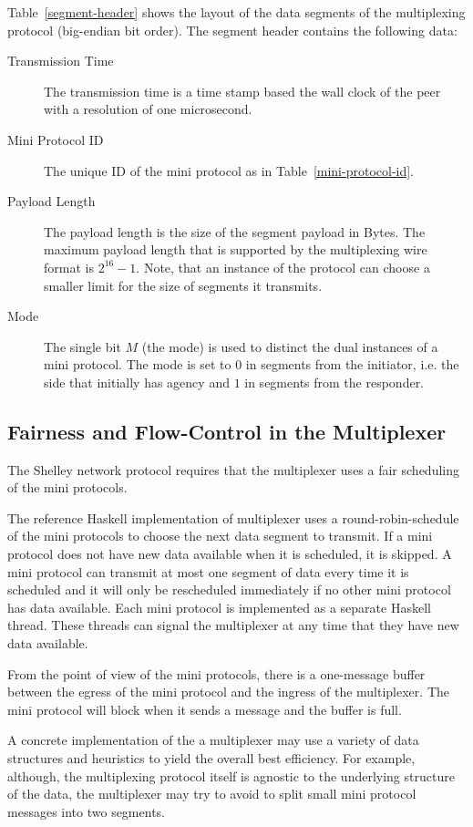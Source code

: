 \documentclass{report}
\theoremstyle{definition}{
  \newtheorem{lemma}{Lemma}[section] %
  \newtheorem{definition}[lemma]{Definition}
}
\theoremstyle{theorem}{
  \newtheorem{invariant}[lemma]{Invariant}
  \newtheorem{proofobligation}[lemma]{Proof Obligation}
}
\numberwithin{equation}{lemma}
\begin{document}
Table~\ref{segment-header} shows the layout of the data segments of the multiplexing protocol
(big-endian bit order).
The segment header contains the following data:
\begin{description}
\item[Transmission Time]
  The transmission time is a time stamp based the wall clock of the peer with a
  resolution of one microsecond.
\item[Mini Protocol ID] The unique ID of the mini protocol as in Table~\ref{mini-protocol-id}.
\item[Payload Length] The payload length is the size of the segment payload in Bytes.
  The maximum payload length that is supported by the multiplexing wire format is $2^{16}-1$.
  Note, that an instance of the protocol can choose a smaller limit for the size of segments it transmits.
\item[Mode] The single bit $M$ (the mode) is used to distinct the dual instances of a mini protocol.
  The mode is set to $0$ in segments from the initiator, i.e. the side that initially has agency and
  $1$ in segments from the responder.
\end{description}

\subsection{Fairness and Flow-Control in the Multiplexer}
The Shelley network protocol requires that the multiplexer uses a fair scheduling of the mini protocols.

The reference Haskell implementation of multiplexer uses a round-robin-schedule of the mini protocols
to choose the next data segment to transmit.
If a mini protocol does not have new data available when it is scheduled, it is skipped.
A mini protocol can transmit at most one segment of data every time it is scheduled
and it will only be rescheduled immediately if no other mini protocol has data available.
Each mini protocol is implemented as a separate Haskell thread.
These threads can signal the multiplexer at any time that they have new data available.

From the point of view of the mini protocols, there is a one-message buffer between the egress of
the mini protocol and the ingress of the multiplexer.
The mini protocol will block when it sends a message and the buffer is full.

A concrete implementation of the a multiplexer may use a variety of data structures and heuristics to
yield the overall best efficiency.
For example, although, the multiplexing protocol itself is agnostic to the underlying structure of
the data, the multiplexer may try to avoid to split small mini protocol messages into two segments.
\end{document}
